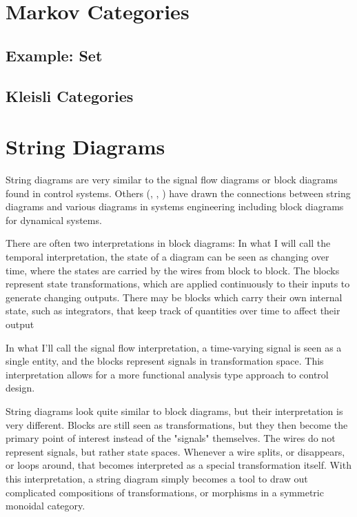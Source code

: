 \section{Markov Categories}

\newcommand{\id}{\mathrm{id}}
\newcommand{\comul}{\Delta}
\newcommand{\counit}{\delta}

\subsection{Example: Set}
\subsection{Kleisli Categories}

\section{String Diagrams}

String diagrams are very similar to the signal flow diagrams or block diagrams found in control systems.
Others (\cite{baez2015control}, \cite{fong2016thesis}, \cite{fong2016dynamicalsystems}) have drawn the connections between string diagrams and various diagrams in systems engineering including block diagrams for dynamical systems.

There are often two interpretations in block diagrams:
In what I will call the temporal interpretation, the state of a diagram can be seen as changing over time, where the states are carried by the wires from block to block. The blocks represent state transformations, which are applied continuously to their inputs to generate changing outputs.
There may be blocks which carry their own internal state, such as integrators, that keep track of quantities over time to affect their output

In what I'll call the signal flow interpretation, a time-varying signal is seen as a single entity, and the blocks represent signals in transformation space. This interpretation allows for a more functional analysis type approach to control design.

String diagrams look quite similar to block diagrams, but their interpretation is very different.
Blocks are still seen as transformations, but they then become the primary point of interest instead of the "signals" themselves.
The wires do not represent signals, but rather state spaces.
Whenever a wire splits, or disappears, or loops around, that becomes interpreted as a special transformation itself.
With this interpretation, a string diagram simply becomes a tool to draw out complicated compositions of transformations, or morphisms in a symmetric monoidal category.

